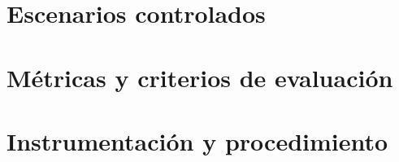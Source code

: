 
\section{Escenarios controlados}

\section{Métricas y criterios de evaluación}

\section{Instrumentación y procedimiento}
